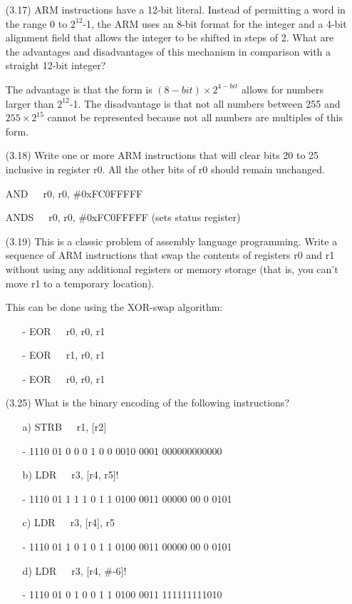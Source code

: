 \documentclass[letterpaper,10pt,titlepage]{article}
\begin{document}
\begin{enumerate}
	\item[(3.17)] ARM instructions have a 12-bit literal. Instead of permitting a word
		in the range 0 to $2^{12}$-1, the ARM uses an 8-bit format for the integer
		and a 4-bit alignment field that allows the integer to be shifted in steps
		of 2. What are the advantages and disadvantages of this mechanism in
		comparison with a straight 12-bit integer?
	\item[\textbullet] The advantage is that the form is $(8-bit) \times  2^{4-bit}$ 
		allows for numbers larger than $2^{12}$-1. The disadvantage is that
		not all numbers between 255 and $255 \times 2^{15}$ cannot be represented 
		because not all numbers are multiples of this form.

	\item[(3.18)] Write one or more ARM instructions that will clear bits 20 to 25
		inclusive in register r0. All the other bits of r0 should remain
		unchanged.
	\item[\textbullet] AND\ \ \ r0, r0, \#0xFC0FFFFF
	\item[\textbullet] ANDS\ \ \ r0, r0, \#0xFC0FFFFF (sets status register)

	\item[(3.19)] This is a classic problem of assembly language programming. Write a
		sequence of ARM instructions that swap the contents of registers r0 and r1
		without using any additional registers or memory storage (that is, you
		can't move r1 to a temporary location).
	\item[\textbullet] This can be done using the XOR-swap algorithm:
		\begin{enumerate}
			\item[-] EOR\ \ \ r0, r0, r1
			\item[-] EOR\ \ \ r1, r0, r1
			\item[-] EOR\ \ \ r0, r0, r1
		\end{enumerate}
	\item[(3.25)] What is the binary encoding of the following instructions?
		\begin{enumerate}
			\item[a)] STRB\ \ \ r1, [r2]
			\item[-] 1110 01 0 0 0 1 0 0 0010 0001 000000000000
			\item[b)] LDR\ \ \ r3, [r4, r5]!
			\item[-] 1110 01 1 1 1 0 1 1 0100 0011 00000 00 0 0101
			\item[c)] LDR\ \ \ r3, [r4], r5
			\item[-] 1110 01 1 0 1 0 1 1 0100 0011 00000 00 0 0101
			\item[d)] LDR\ \ \ r3, [r4, \#-6]!
			\item[-] 1110 01 0 1 0 0 1 1 0100 0011 111111111010
		\end{enumerate}


\end{enumerate}
\end{document}
